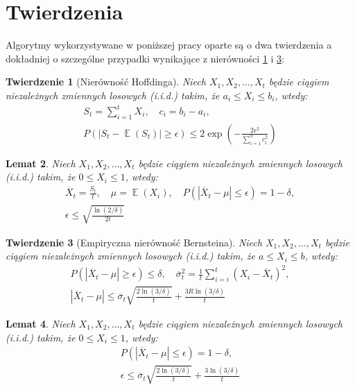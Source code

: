 \documentclass[inzynierska]{pwr_wmat_praca_dyplomowa}
\theoremstyle{plain}
\newtheorem{theorem}{Twierdzenie}
\numberwithin{theorem}{chapter}
\newtheorem{lemma}[theorem]{Lemat}
\theoremstyle{definition}
\numberwithin{theorem}{chapter}
\DeclareMathOperator{\EX}{\mathbb{E}}%
\begin{document}
	\section{Twierdzenia}
	Algorytmy wykorzystywane w poniższej pracy oparte są o dwa twierdzenia a dokładniej o szczególne przypadki wynikające z nierówności \ref{Hoffding ineq} i \ref{Bernsteina emp ineq}:
	\begin{theorem}[Nierówność Hoffdinga]
		\label{Hoffding ineq}
		Niech $X_1,X_2,\dots,X_t$ będzie ciągiem niezależnych zmiennych losowych (i.i.d.) takim, że $a_i \le X_i \le b_i$, wtedy:
		\begin{gather*}
			S_t = \sum_{i=1}^{t} X_i,\quad c_i = b_i - a_i, \\
			P(|S_t - \EX(S_t)| \ge \epsilon ) \le 2\exp\left( -\frac{2\epsilon^2}{\sum_{i=1}^{n} c_i^2} \right)
		\end{gather*}
	\end{theorem}
	\begin{lemma}
		\label{Hoffding ineq lemma}
		Niech $X_1,X_2,\dots,X_t$ będzie ciągiem niezależnych zmiennych losowych (i.i.d.) takim, że $0 \le X_i \le 1$, wtedy:
		\begin{gather*}
			\overline{X}_t = \frac{S_t}{t},\quad 
			\mu = \EX(X_i),\quad  	
			P(|\overline{X}_t - \mu | \le \epsilon ) = 1 - \delta, \\
			\epsilon \le  \sqrt{\frac{\ln(2/\delta)}{2t}}   
		\end{gather*}
	\end{lemma}

		\begin{theorem}[Empiryczna nierówność Bernsteina]
		\label{Bernsteina emp ineq}
		Niech $X_1,X_2,\dots,X_t$ będzie ciągiem niezależnych zmiennych losowych (i.i.d.) takim, że $a \le X_i \le b$, wtedy:
		\begin{gather*}
			P(|\overline{X}_t - \mu| \ge \epsilon ) \le  \delta, \quad \overline \sigma_t^2 = \frac{1}{t}\sum_{i=i}^{t}(X_i - \overline{X}_t)^2, \\
			|\overline{X}_t - \mu | \le \overline{\sigma}_t \sqrt{\frac{2\ln(3/\delta)}{t}} + \frac{3 R \ln{(3 / \delta)}}{t}
		\end{gather*}
	\end{theorem}
	\begin{lemma}\label{Bernsteina emp ineq lemma}
		Niech $X_1,X_2,\dots,X_t$ będzie ciągiem niezależnych zmiennych losowych (i.i.d.) takim, że $0 \le X_i \le 1$, wtedy:
		\begin{gather*}
			P(|\overline{X}_t - \mu | \le \epsilon ) = 1 - \delta,\\
			\epsilon \le \overline{\sigma}_t \sqrt{\frac{2\ln(3/\delta)}{t}} + \frac{3  \ln{(3 / \delta)}}{t}
		\end{gather*}
	\end{lemma}
\end{document}
